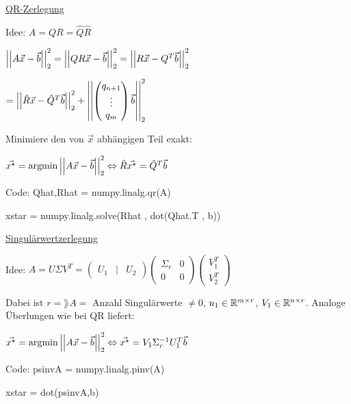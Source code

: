\underline{QR-Zerlegung}

Idee: $A = QR = \hat{Q} \hat{R}$

$\left\vert\left\vert A \vec{x} - \vec{b} \right\vert\right\vert_2^2 = \left\vert\left\vert Q R \vec{x} - \vec{b} \right\vert\right\vert_2^2 = \left\vert\left\vert R \vec{x} - Q^T \vec{b} \right\vert\right\vert_2^2$

$= \left\vert\left\vert \hat{R} \vec{x} - \hat{Q}^T \vec{b} \right\vert\right\vert_2^2 + \left\vert\left\vert \begin{pmatrix}
    q_{n+1} \\ \vdots \\ q_m
\end{pmatrix} \vec{b} \right\vert\right\vert_2^2$

Minimiere den von $\vec{x}$ abhängigen Teil exakt:

$\vec{x^\star} = \text{argmin} \left\vert\left\vert A \vec{x} - \vec{b} \right\vert\right\vert_2^2
\Leftrightarrow \hat{R} \vec{x^\star} = \hat{Q}^T \vec{b}$

Code: Qhat,Rhat = numpy.linalg.qr(A)

\hspace{27pt} xstar = numpy.linalg.solve(Rhat , dot(Qhat.T , b))

\vspace{1\baselineskip}

\underline{Singulärwertzerlegung}

Idee: $A=U \Sigma V^T = \begin{pmatrix} U_1 & | & U_2 \end{pmatrix} \begin{pmatrix}
    \Sigma_r  & 0 \\ 0 & 0 \end{pmatrix} \begin{pmatrix} V_1^T \\ \hline V_2^T \end{pmatrix}$

Dabei ist $r = \rang A =$ Anzahl Singulärwerte $\neq 0$, $u_1 \in \mathbb{R}^{m \times r}$,
$V_1 \in \mathbb{R}^{n \times r}$. Analoge Überlungen wie bei QR liefert:

$\vec{x^\star} = \text{argmin} \left\vert\left\vert A \vec{x} - \vec{b} \right\vert\right\vert_2^2 \Leftrightarrow \vec{x^\star} =
V_1 \Sigma_r^{-1} U_1^T \vec{b}$

Code: psinvA = numpy.linalg.pinv(A)

\hspace{27pt} xstar = dot(psinvA,b)

\vspace{1\baselineskip}

